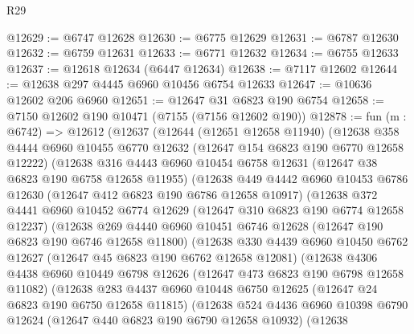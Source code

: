 \begin{lexlean}{R29}
\begin{coremodule}
@12629 := @6747 @12628
@12630 := @6775 @12629
@12631 := @6787 @12630
@12632 := @6759 @12631
@12633 := @6771 @12632
@12634 := @6755 @12633
@12637 := @12618 @12634 (@6447 @12634)
@12638 := @7117 @12602
@12644 := @12638 @297 @4445 @6960 @10456 @6754 @12633
@12647 := @10636 @12602 @206 @6960
@12651 := @12647 @31 @6823 @190 @6754
@12658 := @7150 @12602 @190 @10471 (@7155 (@7156 @12602 @190))
@12878 := fun (m : @6742) =>
  @12612
    (@12637
      (@12644
        (@12651 @12658 @11940)
        (@12638
          @358
          @4444
          @6960
          @10455
          @6770
          @12632
          (@12647 @154 @6823 @190 @6770 @12658 @12222)
          (@12638
            @316
            @4443
            @6960
            @10454
            @6758
            @12631
            (@12647 @38 @6823 @190 @6758 @12658 @11955)
            (@12638
              @449
              @4442
              @6960
              @10453
              @6786
              @12630
              (@12647 @412 @6823 @190 @6786 @12658 @10917)
              (@12638
                @372
                @4441
                @6960
                @10452
                @6774
                @12629
                (@12647 @310 @6823 @190 @6774 @12658 @12237)
                (@12638
                  @269
                  @4440
                  @6960
                  @10451
                  @6746
                  @12628
                  (@12647 @190 @6823 @190 @6746 @12658 @11800)
                  (@12638
                    @330
                    @4439
                    @6960
                    @10450
                    @6762
                    @12627
                    (@12647 @45 @6823 @190 @6762 @12658 @12081)
                    (@12638
                      @4306
                      @4438
                      @6960
                      @10449
                      @6798
                      @12626
                      (@12647 @473 @6823 @190 @6798 @12658 @11082)
                      (@12638
                        @283
                        @4437
                        @6960
                        @10448
                        @6750
                        @12625
                        (@12647 @24 @6823 @190 @6750 @12658 @11815)
                        (@12638
                          @524
                          @4436
                          @6960
                          @10398
                          @6790
                          @12624
                          (@12647 @440 @6823 @190 @6790 @12658 @10932)
                          (@12638

\end{coremodule}
\end{lexlean}
